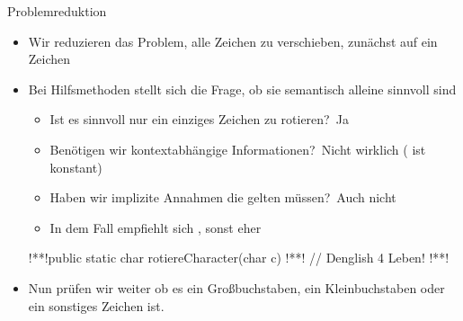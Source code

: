 \begin{frame}[fragile]{Problemreduktion}
    \begin{itemize}[<+(1)->]
        \itemsep7.5pt
        \item Wir reduzieren das Problem, alle Zeichen zu verschieben, zunächst auf ein Zeichen
        \item Bei Hilfsmethoden stellt sich die Frage, ob sie semantisch alleine sinnvoll sind\begin{itemize}
            \itemsep2pt
            \item Ist es sinnvoll nur ein einziges Zeichen zu rotieren?~\pause Ja
            \item Benötigen wir kontextabhängige Informationen?~\pause Nicht wirklich ( ist konstant)
            \item Haben wir implizite Annahmen die gelten müssen?~\pause Auch nicht
            \item In dem Fall empfiehlt sich , sonst eher 
        \end{itemize}
\begin{plainjava}
!**!public static char rotiereCharacter(char c){
!**!   // Denglish 4 Leben!
!**!}
\end{plainjava}
        \item<12-> Nun prüfen wir weiter ob es ein Großbuchstaben, ein Kleinbuchstaben oder ein sonstiges Zeichen ist.
    \end{itemize}
\end{frame}

